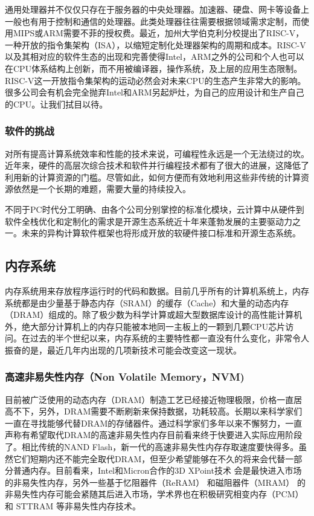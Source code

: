 通用处理器并不仅仅只存在于服务器的中央处理器。加速器、硬盘、网卡等设备上一般也有用于控制和通信的处理器。此类处理器往往需要根据领域需求定制，而使用MIPS或ARM需要不菲的授权费。最近，加州大学伯克利分校提出了RISC-V，一种开放的指令集架构（ISA），以缩短定制化处理器架构的周期和成本。RISC-V以及其相对应的软件生态的出现和完善使得Intel，ARM之外的公司和个人也可以在CPU体系结构上创新，而不用被编译器，操作系统，及上层的应用生态限制。RISC-V这一开放指令集架构的运动必然会对未来CPU的生态产生非常大的影响。很多公司会有机会完全抛弃Intel和ARM另起炉灶，为自己的应用设计和生产自己的CPU。让我们拭目以待。

\subsubsection{软件的挑战}

对所有提高计算系统效率和性能的技术来说，可编程性永远是一个无法绕过的坎。近年来，硬件的高层次综合技术和软件并行编程技术都有了很大的进展，这降低了利用新的计算资源的门槛。尽管如此，如何方便而有效地利用这些非传统的计算资源依然是一个长期的难题，需要大量的持续投入。

不同于PC时代分工明确、由各个公司分别掌控的标准化模块，云计算中从硬件到软件全栈优化和定制化的需求是开源生态系统近十年来蓬勃发展的主要驱动力之一。未来的异构计算软件框架也将形成开放的软硬件接口标准和开源生态系统。

\subsection{内存系统}

内存系统用来存放程序运行时的代码和数据。目前几乎所有的计算机系统上，内存系统都是由少量基于静态内存（SRAM）的缓存（Cache）和大量的动态内存（DRAM）组成的。除了极少数为科学计算或超大型数据库设计的高性能计算机外，绝大部分计算机上的内存只能被本地同一主板上的一颗到几颗CPU芯片访问。在过去的半个世纪以来，内存系统的主要特性都一直没有什么变化，非常令人振奋的是，最近几年内出现的几项新技术可能会改变这一现状。

\subsubsection{高速非易失性内存（Non Volatile Memory，NVM)}

目前被广泛使用的动态内存（DRAM）制造工艺已经接近物理极限，价格一直居高不下，另外，DRAM需要不断刷新来保持数据，功耗较高。长期以来科学家们一直在寻找能够代替DRAM的存储器件。通过科学家们多年以来不懈努力，一直声称有希望取代DRAM的高速非易失性内存目前看来终于快要进入实际应用阶段了。相比传统的NAND Flash，新一代的高速非易失性内存存取速度要快得多。虽然它们短期内还不能完全取代DRAM，但至少希望能够在不久的将来会代替一部分普通内存。目前看来，Intel和Micron合作的3D XPoint技术 \cite{3d-xpoint} 会是最快进入市场的非易失性内存，另外一些基于忆阻器件（ReRAM） \cite{akinaga2010resistive} 和磁阻器件（MRAM） \cite{tehrani1999progress} 的非易失性内存可能会紧随其后进入市场，学术界也在积极研究相变内存（PCM） \cite{raoux2008phase,lee2010phase} 和 STTRAM \cite{kultursay2013evaluating,apalkov2013spin} 等非易失性内存技术。


